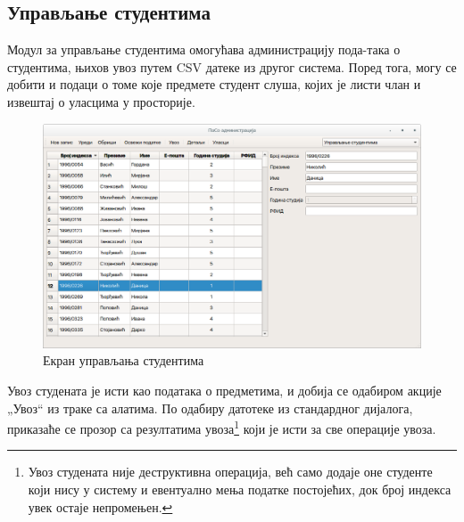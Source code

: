 \documentclass[a4paper, 12pt, diplomski]{etfcyr}
\def\quote#1{„#1“}
\begin{document}
			\subsection{Управљање студентима}
				\begin{justify}
					Модул за управљање студентима омогућава администрацију пода-така о студентима, њихов увоз путем CSV датеке из другог система. Поред тога, могу се добити и подаци о томе које предмете студент слуша, којих је листи члан и извештај о уласцима у просторије.
					\begin{figure}[h]
						\begin{center}
							\includegraphics[width=1.0\textwidth]{manual/students_main_window.png}
						\end{center}
						\caption{Екран управљања студентима}
						\label{figure:students_main_window}
					\end{figure}
					Увоз студената је исти као података о предметима, и добија се одабиром акције \quote{Увоз} из траке са алатима. По одабиру датотеке из стандардног дијалога, приказаће се прозор са резултатима увоза\footnote{Увоз студената није деструктивна операција, већ само додаје оне студенте који нису у систему и евентуално мења податке постојећих, док број индекса увек остаје непромењен.} који је исти за све операције увоза.


\end{justify}
\end{document}
